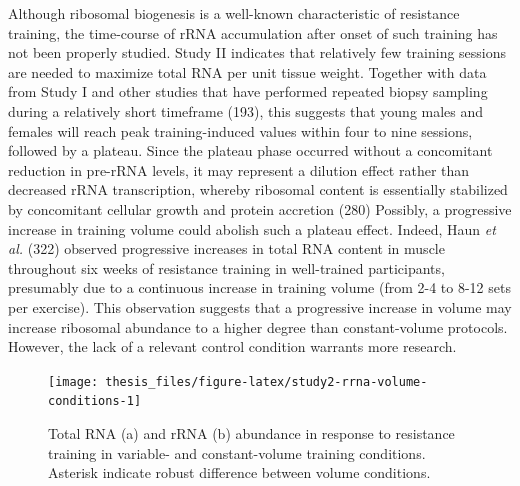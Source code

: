 \documentclass[twoside,10pt]{gihclass} %
\begin{document}
Although ribosomal biogenesis is a well-known characteristic of resistance training, the time-course of rRNA accumulation after onset of such training has not been properly studied.
Study II indicates that relatively few training sessions are needed to maximize total RNA per unit tissue weight.
Together with data from Study I and other studies that have performed repeated biopsy sampling during a relatively short timeframe (193), this suggests that young males and females will reach peak training-induced values within four to nine sessions, followed by a plateau.
Since the plateau phase occurred without a concomitant reduction in pre-rRNA levels, it may represent a dilution effect rather than decreased rRNA transcription, whereby ribosomal content is essentially stabilized by concomitant cellular growth and protein accretion
(280)
Possibly, a progressive increase in training volume could abolish such a plateau effect.
Indeed, Haun \emph{et al.}
(322)
observed progressive increases in total RNA content in muscle throughout six weeks of resistance training in well-trained participants, presumably due to a continuous increase in training volume (from 2-4 to 8-12 sets per exercise). This observation suggests that a progressive increase in volume may increase ribosomal abundance to a higher degree than constant-volume protocols.
However, the lack of a relevant control condition warrants more research.
\begin{figure}

{\centering \texttt{[image: thesis\_files/figure-latex/study2-rrna-volume-conditions-1]} 

}

\caption[Total RNA and rRNA abundance in response to training in Study II.]{Total RNA (a) and rRNA (b) abundance in response to resistance training in variable- and constant-volume training conditions. Asterisk indicate robust difference between volume conditions.}\label{fig:study2-rrna-volume-conditions}
\end{figure}
\end{document}
